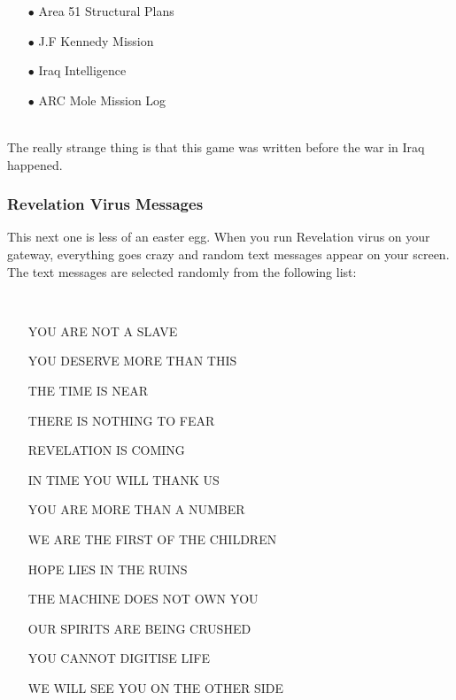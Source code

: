 \documentclass[11pt,twoside,a4paper]{book}
\begin{document}
{\begin{minipage}[ht]{15.00cm}
\begin{itemize}
		\item[$\bullet$] Area 51 Structural Plans
		\item[$\bullet$] J.F Kennedy Mission
		\item[$\bullet$] Iraq Intelligence
		\item[$\bullet$] ARC Mole Mission Log
	\end{itemize}
\end{minipage}~\\
The really strange thing is that this game was written before the war in Iraq happened. %

\subsubsection{Revelation Virus Messages}

This next one is less of an easter egg. When you run Revelation virus on your gateway, everything goes crazy and random text messages appear on your screen. The text messages are selected randomly from the following list: ~\\
\begin{minipage}[ht]{1.50cm} ~\\ \end{minipage} \hfill \begin{minipage}[ht]{15.00cm}
	\begin{itemize}
		\setlength{\itemsep}{1pt}
		\setlength{\parskip}{0pt}
		\setlength{\parsep}{0pt}
	
		\item[] YOU ARE NOT A SLAVE
		\item[] YOU DESERVE MORE THAN THIS
		\item[] THE TIME IS NEAR
		\item[] THERE IS NOTHING TO FEAR
		\item[] REVELATION IS COMING
		\item[] IN TIME YOU WILL THANK US
		\item[] YOU ARE MORE THAN A NUMBER
		\item[] WE ARE THE FIRST OF THE CHILDREN
		\item[] HOPE LIES IN THE RUINS
		\item[] THE MACHINE DOES NOT OWN YOU
		\item[] OUR SPIRITS ARE BEING CRUSHED
		\item[] YOU CANNOT DIGITISE LIFE
		\item[] WE WILL SEE YOU ON THE OTHER SIDE
	\end{itemize}
\end{minipage}~\\	
	
}
\end{document}
